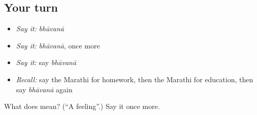 \subsection*{Your turn}
\begin{itemize}
\raggedright
  \item \emph{Say it:} \emph{bhāvanā}
  \item \emph{Say it:} \emph{bhāvanā}, once more
  \item \emph{Say it:} say \emph{bhāvanā}
  \item \emph{Recall:} say the Marathi for homework, then the Marathi for education, then say \emph{bhāvanā} again
\end{itemize}

\begin{tcolorbox}[breakable,colback=teal!4,colframe=teal!35!black,title={Before you move on}]
What does  mean? (\textquotedblleft{}A feeling\textquotedblright{}.) Say it once more.
\end{tcolorbox}

